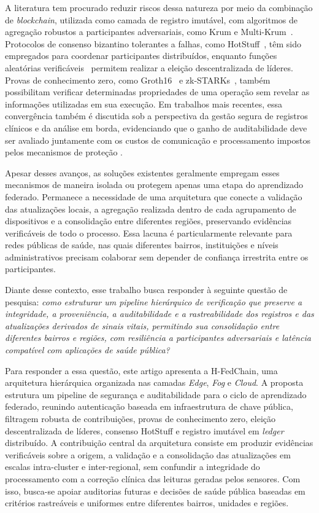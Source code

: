 \documentclass[12pt]{article}
\begin{document}
A literatura tem procurado reduzir riscos dessa natureza por meio da combinação de \textit{blockchain}, utilizada como camada de registro imutável, com algoritmos de agregação robustos a participantes adversariais, como Krum e Multi-Krum~\cite{blanchard2017machine}. Protocolos de consenso bizantino tolerantes a falhas, como HotStuff~\cite{yin2019hotstuff}, têm sido empregados para coordenar participantes distribuídos, enquanto funções aleatórias verificáveis~\cite{micali1999verifiable} permitem realizar a eleição descentralizada de líderes. Provas de conhecimento zero, como Groth16~\cite{groth2016size} e zk-STARKs~\cite{ben2018scalable}, também possibilitam verificar determinadas propriedades de uma operação sem revelar as informações utilizadas em sua execução. Em trabalhos mais recentes, essa convergência também é discutida sob a perspectiva da gestão segura de registros clínicos e da análise em borda, evidenciando que o ganho de auditabilidade deve ser avaliado juntamente com os custos de comunicação e processamento impostos pelos mecanismos de proteção \cite{khan2025advancing,munusamy2025blockchain}.

Apesar desses avanços, as soluções existentes geralmente empregam esses mecanismos de maneira isolada ou protegem apenas uma etapa do aprendizado federado. Permanece a necessidade de uma arquitetura que conecte a validação das atualizações locais, a agregação realizada dentro de cada agrupamento de dispositivos e a consolidação entre diferentes regiões, preservando evidências verificáveis de todo o processo. Essa lacuna é particularmente relevante para redes públicas de saúde, nas quais diferentes bairros, instituições e níveis administrativos precisam colaborar sem depender de confiança irrestrita entre os participantes.

Diante desse contexto, esse trabalho busca responder à seguinte questão de pesquisa: \textit{como estruturar um pipeline hierárquico de verificação que preserve a integridade, a proveniência, a auditabilidade e a rastreabilidade dos registros e das atualizações derivados de sinais vitais, permitindo sua consolidação entre diferentes bairros e regiões, com resiliência a participantes adversariais e latência compatível com aplicações de saúde pública?}

Para responder a essa questão, este artigo apresenta a H-FedChain, uma arquitetura hierárquica organizada nas camadas \textit{Edge}, \textit{Fog} e \textit{Cloud}. A proposta estrutura um pipeline de segurança e auditabilidade para o ciclo de aprendizado federado, reunindo autenticação baseada em infraestrutura de chave pública, filtragem robusta de contribuições, provas de conhecimento zero, eleição descentralizada de líderes, consenso HotStuff e registro imutável em \textit{ledger} distribuído. A contribuição central da arquitetura consiste em produzir evidências verificáveis sobre a origem, a validação e a consolidação das atualizações em escalas intra-cluster e inter-regional, sem confundir a integridade do processamento com a correção clínica das leituras geradas pelos sensores. Com isso, busca-se apoiar auditorias futuras e decisões de saúde pública baseadas em critérios rastreáveis e uniformes entre diferentes bairros, unidades e regiões.
\end{document}
